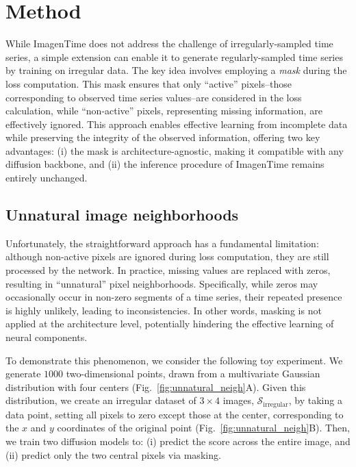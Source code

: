 \documentclass{article}
\theoremstyle{plain}
\theoremstyle{definition}
\theoremstyle{remark}
\begin{document}
\section{Method}
\label{sec:method}
\vspace{-2mm}

While ImagenTime does not address the challenge of irregularly-sampled time series, a simple extension can enable it to generate regularly-sampled time series by training on irregular data. The key idea involves employing a \emph{mask} during the loss computation. This mask ensures that only ``active'' pixels--those corresponding to observed time series values--are considered in the loss calculation, while ``non-active'' pixels, representing missing information, are effectively ignored. This approach enables effective learning from incomplete data while preserving the integrity of the observed information, offering two key advantages: (i) the mask is architecture-agnostic, making it compatible with any diffusion backbone, and (ii) the inference procedure of ImagenTime remains entirely unchanged.

\vspace{-3mm}
\subsection{Unnatural image neighborhoods}
\label{subsec:neigh}
\vspace{-2mm}
Unfortunately, the straightforward approach has a fundamental limitation: although non-active pixels are ignored during loss computation, they are still processed by the network. In practice, missing values are replaced with zeros, resulting in ``unnatural'' pixel neighborhoods. Specifically, while zeros may occasionally occur in non-zero segments of a time series, their repeated presence is highly unlikely, leading to inconsistencies. In other words, masking is not applied at the architecture level, potentially hindering the effective learning of neural components.

To demonstrate this phenomenon, we consider the following toy experiment. We generate $1000$ two-dimensional points, drawn from a multivariate Gaussian distribution with four centers (Fig.~\ref{fig:unnatural_neigh}A). Given this distribution, we create an irregular dataset of $3 \times 4$ images, $\mathcal{S}_{\mathrm{irregular}}$, by taking a data point, setting all pixels to zero except those at the center, corresponding to the $x$ and $y$ coordinates of the original point (Fig.~\ref{fig:unnatural_neigh}B). Then, we train two diffusion models to: (i) predict the score across the entire image, and (ii) predict only the two central pixels via masking. 
\end{document}
